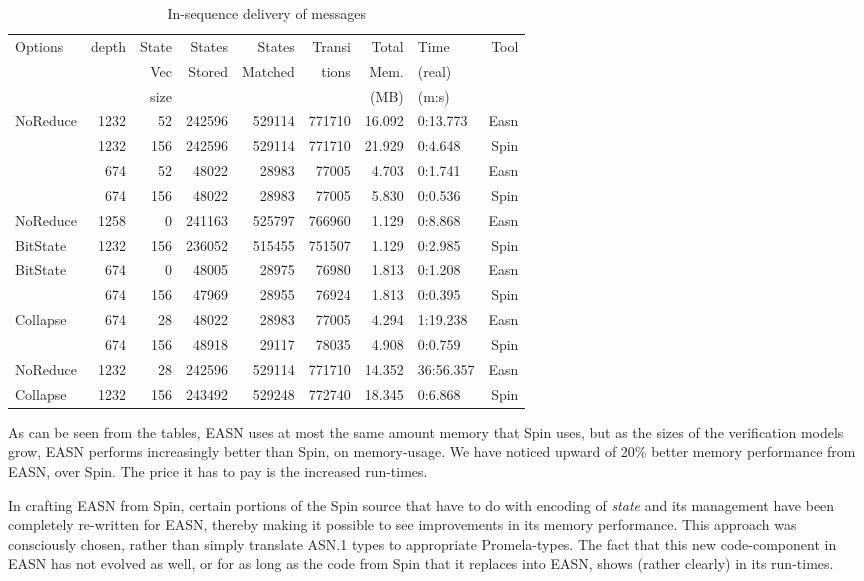 \documentclass{entcs} \usepackage{entcsmacro}
\begin{document}
\begin{table}[ht]
\caption{In-sequence delivery of messages}
\begin{center}
\begin{tabular}{||l|r|r|r|r|r|r|l|r||}
\hline
Options & depth & State & States & States  & Transi & Total & Time   &Tool\\
        &       & Vec   & Stored & Matched &  tions & Mem.  & (real) &    \\
        &       & size  &        &         &        & (MB)  & (m:s)  &    \\
\hline
 NoReduce & 1232& 52& 242596& 529114& 771710& 16.092& 0:13.773& Easn\\ %
& 1232& 156& 242596& 529114& 771710& 21.929& 0:4.648&Spin\\ \hline
 & 674& 52& 48022& 28983& 77005& 4.703& 0:1.741& Easn\\ %
& 674& 156& 48022& 28983& 77005& 5.830& 0:0.536&Spin\\ \hline
 NoReduce & 1258& 0& 241163& 525797& 766960& 1.129& 0:8.868& Easn\\ %
BitState & 1232& 156& 236052& 515455& 751507& 1.129& 0:2.985&Spin\\ \hline
 BitState & 674& 0& 48005& 28975& 76980& 1.813& 0:1.208& Easn\\ %
 & 674& 156& 47969& 28955& 76924& 1.813& 0:0.395&  Spin\\ \hline
 Collapse & 674& 28& 48022& 28983& 77005& 4.294& 1:19.238&Easn\\ %
 & 674& 156& 48918& 29117& 78035& 4.908& 0:0.759& Spin\\ \hline
 NoReduce & 1232& 28& 242596& 529114& 771710& 14.352& 36:56.357&Easn\\ %
 Collapse & 1232& 156& 243492& 529248& 772740& 18.345& 0:6.868 & Spin\\
\hline
\end{tabular}
\end{center}
\end{table}

As can be seen from the tables, EASN uses at most the same amount
memory that Spin uses, but as the sizes of the verification models
grow, EASN performs increasingly better than Spin, on memory-usage. We
have noticed upward of 20\% better memory performance from EASN, over
Spin. The price it has to pay is the increased run-times.

In crafting EASN from Spin, certain portions of the Spin source that
have to do with encoding of \emph{state} and its management have been
completely re-written for EASN, thereby making it possible to see
improvements in its memory performance. This approach was consciously
chosen, rather than simply translate ASN.1 types to appropriate
Promela-types. The fact that this new code-component in EASN has not
evolved as well, or for as long as the code from Spin that it replaces
into EASN, shows (rather clearly) in its run-times.
\end{document}
